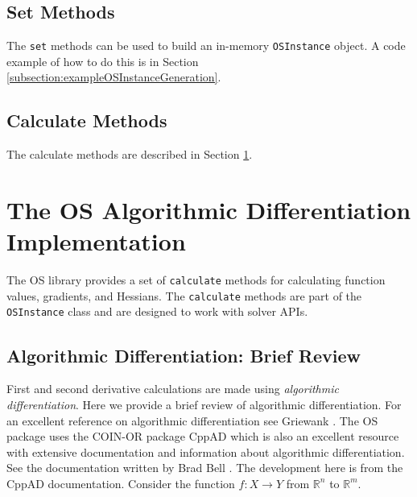 \documentclass[11pt]{article}
\renewcommand{\_}{{\char"5F}}
\renewcommand{\{}{{\char"7B}}
\renewcommand{\}}{{\char"7D}}
\renewcommand{\^}{{\char"0D}}
\renewcommand{\'}{{\char"0D}}
\begin{document}
\subsection{Set Methods}

The {\tt set} methods can be used to build an in-memory {\tt OSInstance}
 object. A code example of how to do this is in Section \ref{subsection:exampleOSInstanceGeneration}.

\subsection{Calculate Methods}

The calculate methods are described in Section \ref{section:ad}.

\section{The OS Algorithmic Differentiation Implementation}\label{section:ad}

The OS library provides a set of {\tt calculate} methods for calculating  function values, gradients, and Hessians.     The {\tt calculate} methods are part of the {\tt OSInstance} class and are designed to work with solver APIs.



\subsection{Algorithmic Differentiation:  Brief Review}\label{section:adtheory}

First and second derivative calculations are made using {\it  algorithmic differentiation}.  Here we provide a brief review of algorithmic differentiation.  For an excellent reference on algorithmic differentiation see Griewank \cite{griewank2000}.  The OS package uses the COIN-OR package CppAD which  is also an excellent resource with extensive  documentation and information about algorithmic differentiation. See the documentation written by  Brad Bell \cite{bell2007}.    The development here is from the CppAD documentation.  Consider the function $f:X \rightarrow Y$ from $ \mathbb{R}^{n}$ to $ \mathbb{R}^{m}.$
\end{document}
